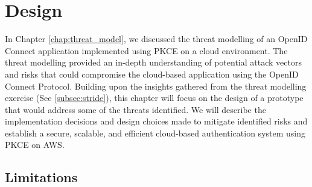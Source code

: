 \chapter{Design}

In Chapter \ref{chap:threat_model}, we discussed the threat modelling of an OpenID Connect application implemented using PKCE on a cloud environment. The threat modelling provided an in-depth understanding of potential attack vectors and risks that could compromise the cloud-based application using the OpenID Connect Protocol. Building upon the insights gathered from the threat modelling exercise (See \ref{subsec:stride}), this chapter will focus on the design of a prototype that would address some of the threats identified. We will describe the implementation decisions and design choices made to mitigate identified risks and establish a secure, scalable, and efficient cloud-based authentication system using PKCE on AWS.


\section{Limitations}
